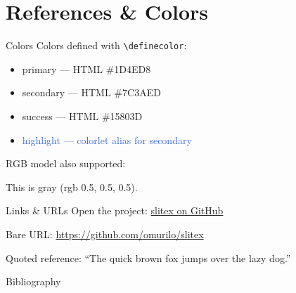\documentclass[aspectratio=169]{beamer}
\begin{document}
\section{References \& Colors}

\begin{frame}{Colors}
  Colors defined with \texttt{\textbackslash definecolor}:

  \begin{itemize}
    \item \textcolor{primary}{primary — HTML \#1D4ED8}
    \item \textcolor{secondary}{secondary — HTML \#7C3AED}
    \item \textcolor{success}{success — HTML \#15803D}
    \item \textcolor{highlight}{highlight — colorlet alias for secondary}
  \end{itemize}

  \bigskip

  RGB model also supported:

  \textcolor{mygray}{This is gray (rgb 0.5, 0.5, 0.5).}
\end{frame}

\begin{frame}{Links \& URLs}
  Open the project: \href{https://github.com/omurilo/slitex}{slitex on GitHub}

  \medskip

  Bare URL: \url{https://github.com/omurilo/slitex}

  \medskip

  Quoted reference: \enquote{The quick brown fox jumps over the lazy dog.}
\end{frame}

\begin{frame}{Bibliography}
  \printbibliography
\end{frame}
\end{document}
